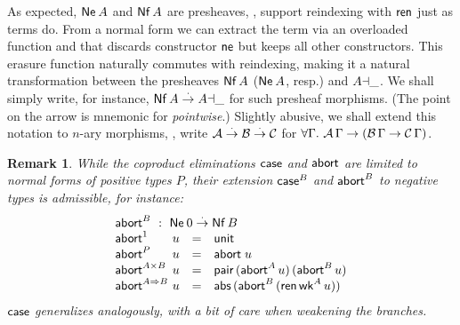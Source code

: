 \documentclass[sigplan,screen]{acmart}
\newtheorem{remark}{Remark}
\begin{document}
As expected, $\mathsf{Ne}^{}\,A$ and $\mathsf{Nf}\,A$ are presheaves,
\ie, support reindexing with $\mathsf{ren}$ just as terms do.
From a normal form we can extract the term via an overloaded function
 and
that discards constructor $\mathsf{ne}$ but keeps all other constructors.
This erasure function naturally commutes with reindexing, making it a
natural transformation between the presheaves $\mathsf{Nf}\,A$ ($\mathsf{Ne}^{}\,A$,
resp.) and $A{\dashv}\_$.  We shall simply write, for instance,
$\mathsf{Nf}\,A \stackrel{\cdot}{\to} A{\dashv}\_$ for such presheaf morphisms.
(The point on the arrow is mnemonic for \emph{pointwise}.)
Slightly abusive, we shall extend this notation to $n$-ary
morphisms, \eg, write $\mathcal{A} \stackrel{\cdot}{\to} \mathcal{B} \stackrel{\cdot}{\to} \mathcal{C}$ for
$\forall \Gamma.\ \mathcal{A}\,\Gamma \to (\mathcal{B}\,\Gamma \to \mathcal{C}\,\Gamma)$.

\begin{remark}
While the coproduct eliminations $\mathsf{case}$ and $\mathsf{abort}$ are limited to
normal forms of positive types $P$, their extension $\mathsf{case}^B$ and
$\mathsf{abort}^B$ to negative types
is admissible, for instance:
\[
\begin{array}{l@{~}lcl}
  \multicolumn 4 l {\tabort^B ~:~ \tNe\, 0 \todot \tNf\,B} \\
  \tabort^{\tyone}     & u & = & \tunit \\
  \tabort^P           & u & = & \tabort\;u \\
  \tabort^{A \times B} & u & = & \tpair\,(\tabort^A\,u)\,(\tabort^B\,u) \\
  \tabort^{A \To B}    & u & = & \tabs\,(\tabort^B\,(\tren\,\twk^A\,u)) \\
\end{array}
\]
$\mathsf{case}$ generalizes analogously, with a bit of care when weakening
the branches.
\end{remark}
\end{document}
